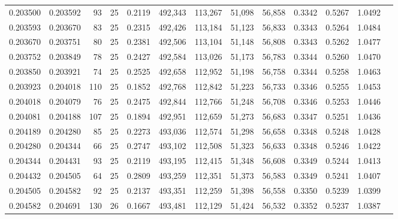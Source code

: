 \begin{tabular}{rrrrrrrrrrrrr}
0.203500 & 0.203592 &    93 &  25 &                                     0.2119 & 492,343 & 113,267 &  51,098 &  56,858 & 0.3342 & 0.5267 & 1.0492 \\
0.203593 & 0.203670 &    83 &  25 &                                     0.2315 & 492,426 & 113,184 &  51,123 &  56,833 & 0.3343 & 0.5264 & 1.0484 \\
0.203670 & 0.203751 &    80 &  25 &                                     0.2381 & 492,506 & 113,104 &  51,148 &  56,808 & 0.3343 & 0.5262 & 1.0477 \\
0.203752 & 0.203849 &    78 &  25 &                                     0.2427 & 492,584 & 113,026 &  51,173 &  56,783 & 0.3344 & 0.5260 & 1.0470 \\
0.203850 & 0.203921 &    74 &  25 &                                     0.2525 & 492,658 & 112,952 &  51,198 &  56,758 & 0.3344 & 0.5258 & 1.0463 \\
0.203923 & 0.204018 &   110 &  25 &                                     0.1852 & 492,768 & 112,842 &  51,223 &  56,733 & 0.3346 & 0.5255 & 1.0453 \\
0.204018 & 0.204079 &    76 &  25 &                                     0.2475 & 492,844 & 112,766 &  51,248 &  56,708 & 0.3346 & 0.5253 & 1.0446 \\
0.204081 & 0.204188 &   107 &  25 &                                     0.1894 & 492,951 & 112,659 &  51,273 &  56,683 & 0.3347 & 0.5251 & 1.0436 \\
0.204189 & 0.204280 &    85 &  25 &                                     0.2273 & 493,036 & 112,574 &  51,298 &  56,658 & 0.3348 & 0.5248 & 1.0428 \\
0.204280 & 0.204344 &    66 &  25 &                                     0.2747 & 493,102 & 112,508 &  51,323 &  56,633 & 0.3348 & 0.5246 & 1.0422 \\
0.204344 & 0.204431 &    93 &  25 &                                     0.2119 & 493,195 & 112,415 &  51,348 &  56,608 & 0.3349 & 0.5244 & 1.0413 \\
0.204432 & 0.204505 &    64 &  25 &                                     0.2809 & 493,259 & 112,351 &  51,373 &  56,583 & 0.3349 & 0.5241 & 1.0407 \\
0.204505 & 0.204582 &    92 &  25 &                                     0.2137 & 493,351 & 112,259 &  51,398 &  56,558 & 0.3350 & 0.5239 & 1.0399 \\
0.204582 & 0.204691 &   130 &  26 &                                     0.1667 & 493,481 & 112,129 &  51,424 &  56,532 & 0.3352 & 0.5237 & 1.0387 \\

\end{tabular}
